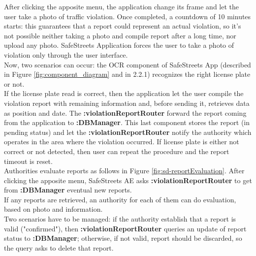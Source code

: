 \documentclass{article}
\begin{document}
			After clicking the apposite menu, the application change its frame and let the user take a photo of traffic violation. Once completed, a countdown of 10 minutes starts: this guarantees that a report could represent an actual violation, so it's not possible neither taking a photo and compile report after a long time, nor upload any photo. SafeStreets Application forces the user to take a photo of violation only through the user interface.\\
			Now, two scenarios can occur: the OCR component of SafeStreets App (described in Figure \ref{fig:component_diagram} and in 2.2.1) recognizes the right license plate or not.\\
			If the license plate read is correct, then the application let the user compile the violation report with remaining information and, before sending it, retrieves data as position and date. 
			The \textbf{:violationReportRouter} forward the report coming from the application to \textbf{:DBManager}.
			This last component stores the report (in pending status) and let the \textbf{:violationReportRouter} notify the authority which operates in the area where the violation occurred. 
			If license plate is either not correct or not detected, then user can repeat the procedure and the report timeout is reset.\\
			
			Authorities evaluate reports as follows in Figure \ref{fig:sd-reportEvaluation}.
			After clicking the apposite menu, SafeStreets AE asks \textbf{:violationReportRouter} to get from \textbf{:DBManager} eventual new reports.\\
			If any reports are retrieved, an authority for each of them can do evaluation, based on photo and information.\\
			Two scenarios have to be managed: if the authority establish that a report is valid ("confirmed"), then \textbf{:violationReportRouter} queries an update of report status to \textbf{:DBManager}; otherwise, if not valid, report should be discarded, so the query asks to delete that report.
			
\end{document}
